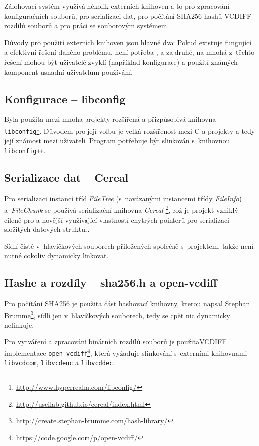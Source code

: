 Zálohovací systém využívá několik externích knihoven a to pro zpracování
konfiguračních souborů, pro serializaci dat, pro počítání \gls{SHA256} hashů
\gls{VCDIFF} rozdílů souborů a pro práci se souborovým systémem.

Důvody pro použití externích knihoven jsou hlavně dva: Pokud existuje fungující
a efektivní řešení daného problému, není potřeba , a za
druhé, na mnohá z~těchto řešení mohou být uživatelé zvyklí (například konfigurace)
a použití známých komponent usnadní uživatelům používání.

\subsection*{Konfigurace -- libconfig}

Byla použita mezi mnoha projekty rozšířená a přizpůsobivá knihovna
\texttt{libconfig}\footnote{\url{http://www.hyperrealm.com/libconfig/}}. Důvodem
pro její volbu je velká rozšířenost mezi C a \Cpp projekty a tedy její známost
mezi uživateli. Program potřebuje být slinkován s~knihovnou
\texttt{libconfig++}.

\subsection*{Serializace dat -- Cereal}

Pro serializaci instancí tříd {\it FileTree} (s~navázanými instancemi třídy
{\it FileInfo}) a~{\it FileChunk} se používá serializační knihovna {\it Cereal}%
\footnote{\url{http://uscilab.github.io/cereal/index.html}}, což je projekt
vzniklý cíleně pro  a novější využívající vlastností chytrých
pointerů pro serializaci složitých datových struktur.

Sídlí čistě v~hlavičkových souborech přiložených společně s~projektem, takže
není nutné cokoliv dynamicky linkovat.

\subsection*{Hashe a rozdíly -- sha256.h a open-vcdiff}

Pro počítání \gls{SHA256} je použita část hashovací knihovny, kterou napsal
Stephan Brumme\footnote{\url{http://create.stephan-brumme.com/hash-library/}},
sídlí jen v~hlavičkových souborech, tedy se opět nic dynamicky nelinkuje.

Pro vytváření a zpracování binárních rozdílů souborů je použita\gls{VCDIFF}
implementace \texttt{open-vcdiff}\footnote{\url{https://code.google.com/p/open-vcdiff/}},
která vyžaduje slinkování s~externími knihovnami \texttt{libvcdcom}, \texttt{libvcdenc}
a \texttt{libvcddec}.

